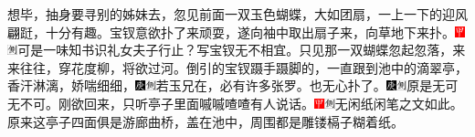 想毕，抽身要寻别的姊妹去，忽见前面一双玉色蝴蝶，大如团扇，一上一下的迎风翩跹，十分有趣。宝钗意欲扑了来顽耍，遂向袖中取出扇子来，向草地下来扑。{\includegraphics[width=3mm]{../Images/00002}\includegraphics[width=3mm]{../Images/00011}\footnotesize \kaishu 可是一味知书识礼女夫子行止？写宝钗无不相宜。}只见那一双蝴蝶忽起忽落，来来往往，穿花度柳，将欲过河。倒引的宝钗蹑手蹑脚的，一直跟到池中的滴翠亭，香汗淋漓，娇喘细细，{\includegraphics[width=3mm]{../Images/00004}\includegraphics[width=3mm]{../Images/00011}\footnotesize \kaishu 若玉兄在，必有许多张罗。}也无心扑了。{\includegraphics[width=3mm]{../Images/00004}\includegraphics[width=3mm]{../Images/00011}\footnotesize \kaishu 原是无可无不可。}刚欲回来，只听亭子里面嘁嘁喳喳有人说话。{\includegraphics[width=3mm]{../Images/00002}\includegraphics[width=3mm]{../Images/00011}\footnotesize \kaishu 无闲纸闲笔之文如此。}原来这亭子四面俱是游廊曲桥，盖在池中，周围都是雕镂槅子糊着纸。

